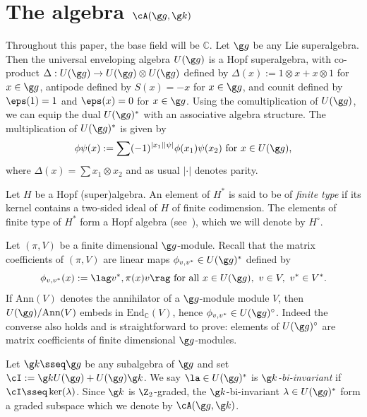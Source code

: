 \documentclass[11pt]{amsart}
\begin{document}
\section{The algebra $\cA(\g g,\g k)$}\label{chapter1}


Throughout this paper, the base field will be $\mathbb{C}$.
Let $\g g$ be any Lie superalgebra. Then the universal enveloping algebra $U(\g g)$ is a Hopf superalgebra, with co-product $\Delta:U(\g g)\to U(\g g)\otimes U(\g g)$ defined by $\Delta(x):=1\otimes x+x\otimes 1$ for $x\in \g g$, antipode defined by $S(x)=-x$ for $x\in \g g$, and counit defined by $\eps(1)=1$ and $\eps(x)=0$ for $x\in \g g$.
Using the comultiplication of $U(\g g)$, we can equip the dual  $U(\g g)^*$ with an associative algebra structure. The multiplication of $U(\g g)^*$ is given by
\[
\phi\psi(x):=\sum (-1)^{|x_1||\psi|} \phi(x_1)\psi(x_2)\text{ for $x\in U(\g g)$,}
\] 
where $\Delta(x)=\sum x_1\otimes x_2$ and as usual $|\cdot|$ denotes  parity.

\begin{rmk}
Let $H$ be a Hopf (super)algebra. An element of $H^*$ is said to be of \emph{finite type} if its kernel contains a two-sided ideal of $H$ of finite codimension. The elements of finite type of $H^*$ form a Hopf
algebra (see~\cite[Ch. VI]{sweedler1969hopf}), which we will denote by $H^\circ$.  
\end{rmk}


Let $(\pi,V)$ be a finite dimensional $\g g$-module. Recall that the matrix coefficients of $(\pi,V)$ are linear maps $\phi_{v,v^*}\in U(\g g)^*$ defined by 
\begin{equation}
\label{phivv*eq}
\phi_{v,v^*}(x):=\lag v^*,\pi(x)v\rag
\text{ for all }x\in U(\g g),\ v\in V,\ v^*\in V^*.
\end{equation}
If $\mathrm{Ann}(V)$ denotes the annihilator
of a $\g g$-module module $V$, then $U(\g g)/\mathrm{Ann}(V)$ embeds in 
$\mathrm{End}_{\mathbb{C}}(V)$, hence
 $\phi_{v,v^*}\in U(\g g)^\circ$. Indeed the converse also holds and is straightforward to prove:  elements of $U(\g g)^\circ$ are  
 matrix coefficients of finite dimensional $\g g$-modules. 




Let $\g k\sseq \g g$ be any subalgebra of $\g g$ and set $\cI:=\g kU(\g g)+U(\g g)\g k$. We say $\la\in U(\g g)^*$ is  \emph{$\g k$-bi-invariant}  if 
$
\cI\sseq\ker(\lambda)
$.
Since $\g k$ is $\Z_2$-graded, the $\g k$-bi-invariant $\lambda\in U(\g g)^*$ form a graded subspace which we denote by $\cA(\g g ,\g k)$.
\end{document}
